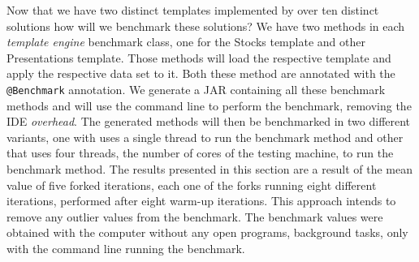 \noindent
Now that we have two distinct templates implemented by over ten distinct solutions how will we benchmark these solutions? We have two methods in each \textit{template engine} benchmark class, one for the Stocks template and other Presentations template. Those methods will load the respective template and apply the respective data set to it. Both these method are annotated with the \texttt{@Benchmark} annotation. We generate a \ac{JAR} containing all these benchmark methods and will use the command line to perform the benchmark, removing the \ac{IDE} \textit{overhead}. The generated methods will then be benchmarked in two different variants, one with uses a single thread to run the benchmark method and other that uses four threads, the number of cores of the testing machine, to run the benchmark method. The results presented in this section are a result of the mean value of five forked iterations, each one of the forks running eight different iterations, performed after eight warm-up iterations. This approach intends to remove any outlier values from the benchmark. The benchmark values were obtained with the computer without any open programs, background tasks, only with the command line running the benchmark.

\pgfplotsset{compat=1.5}

